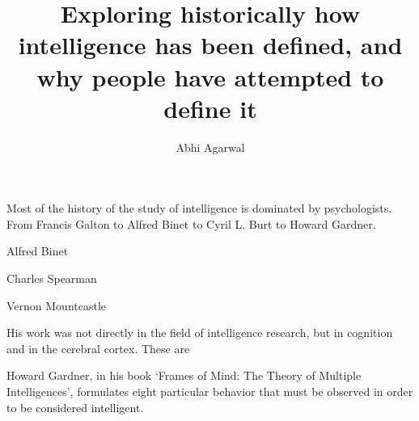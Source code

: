 \documentclass[11pt, oneside]{article}
\title{Exploring historically how intelligence has been defined, and why people have attempted to define it\vspace{-0.4cm}}
\author{Abhi Agarwal\vspace{-1cm}}
\date{}
\begin{document}
\maketitle


\par Most of the history of the study of intelligence is dominated by psychologists. From Francis Galton to Alfred Binet to Cyril L. Burt to Howard Gardner.





\par Alfred Binet


\par Charles Spearman


% 


\par Vernon Mountcastle 
\par His work was not directly in the field of intelligence research, but in cognition and in the cerebral cortex. These are 


\par Howard Gardner, in his book `Frames of Mind: The Theory of Multiple Intelligences', formulates eight particular behavior that must be observed in order to be considered intelligent. 
\end{document}
